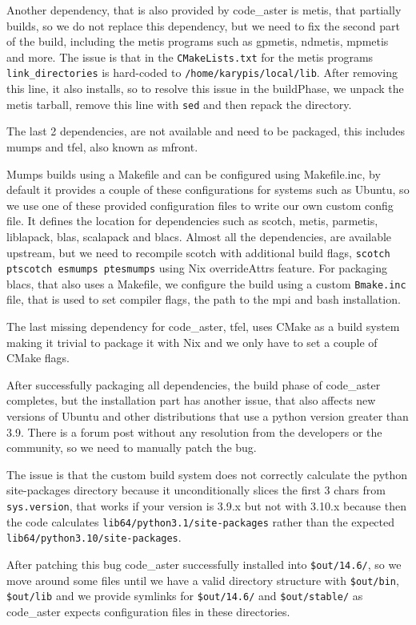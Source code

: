 \documentclass{eceasst}
\begin{document}
Another dependency, that is also provided by code\_aster is metis, that partially builds, so we do not replace this dependency, but we need to fix the second part of the build, including the metis programs such as gpmetis, ndmetis, mpmetis and more.
The issue is that in the \texttt{CMakeLists.txt} for the metis programs \texttt{link\_directories} is hard-coded to \texttt{/home/karypis/local/lib}.
After removing this line, it also installs, so to resolve this issue in the buildPhase, we unpack the metis tarball, remove this line with \texttt{sed} and then repack the directory.

The last 2 dependencies, are not available and need to be packaged, this includes mumps and tfel, also known as mfront.

Mumps builds using a Makefile and can be configured using Makefile.inc, by default it provides a couple of these configurations for systems such as Ubuntu, so we use one of these provided configuration files to write our own custom config file.
It defines the location for dependencies such as scotch, metis, parmetis, liblapack, blas, scalapack and blacs.
Almost all the dependencies, are available upstream, but we need to recompile scotch with additional build flags, \texttt{scotch ptscotch esmumps ptesmumps} using Nix overrideAttrs feature.
For packaging blacs, that also uses a Makefile, we configure the build using a custom \texttt{Bmake.inc} file, that is used to set compiler flags, the path to the mpi and bash installation.

The last missing dependency for code\_aster, tfel, uses CMake as a build system making it trivial to package it with Nix and we only have to set a couple of CMake flags.

After successfully packaging all dependencies, the build phase of code\_aster completes, but the installation part has another issue, that also affects new versions of Ubuntu and other distributions that use a python version greater than 3.9.
There is a forum post without any resolution from the developers or the community, so we need to manually patch the bug.

The issue is that the custom build system does not correctly calculate the python site-packages directory because it unconditionally slices the first 3 chars from \texttt{sys.version}, that works if your version is 3.9.x but not with 3.10.x because then the code calculates \texttt{lib64/python3.1/site-packages} rather than the expected \texttt{lib64/python3.10/site-packages}.

After patching this bug code\_aster successfully installed into \texttt{\$out/14.6/}, so we move around some files until we have a valid directory structure with \texttt{\$out/bin}, \texttt{\$out/lib} and we provide symlinks for \texttt{\$out/14.6/} and \texttt{\$out/stable/} as code\_aster expects configuration files in these directories.
\end{document}
